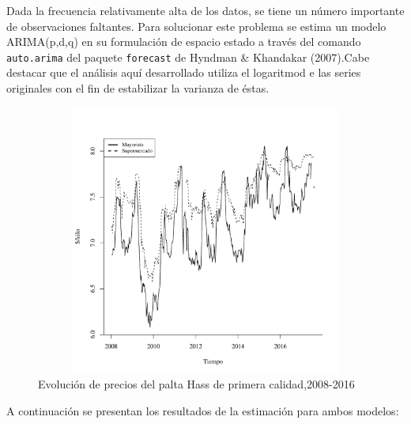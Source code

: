 \documentclass[12pt, twoside]{book}\usepackage[]{graphicx}\usepackage[]{color}
\newenvironment{knitrout}{}{} %
\numberwithin{equation}{section}
\numberwithin{theorem}{section}
\numberwithin{teorema}{section}
\numberwithin{defi}{section}
\numberwithin{prop}{section}
\numberwithin{defi}{section}
\theoremstyle{plain}
\begin{document}
Dada la frecuencia relativamente alta de los datos, se tiene un número importante de observaciones faltantes. Para solucionar este problema se estima un modelo ARIMA(p,d,q) en su formulación de espacio estado a través del comando \texttt{auto.arima} del paquete \texttt{forecast} de Hyndman \& Khandakar (2007).Cabe destacar que el análisis aquí desarrollado utiliza el logaritmod e las series originales con el fin de estabilizar la varianza de éstas.


\begin{knitrout}
\color{fgcolor}\begin{figure}[H]

{\centering \includegraphics[width=6.5in,height=3.5in]{figure/fig-2-1} 

}

\caption[Evolución de precios del palta Hass de primera calidad,2008-2016]{Evolución de precios del palta Hass de primera calidad,2008-2016}\label{fig:fig-2}
\end{figure}


\end{knitrout}

A continuación se presentan los resultados de la estimación para ambos modelos: 
\end{document}
